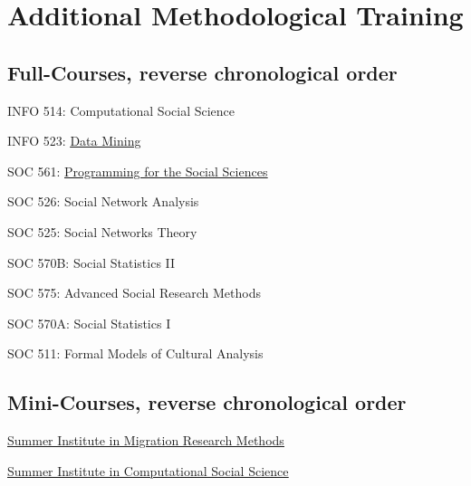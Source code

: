 
\section*{Additional Methodological Training}

\subsection*{Full-Courses, reverse chronological order}

INFO 514: Computational Social Science 

INFO 523: \href{https://kelseygonzalez.github.io/datamining/}
{\underline{Data Mining}} 

SOC 561: \href{https://jearl.faculty.arizona.edu/index.php/content/stata-resources-data-management}
{\underline{Programming for the Social Sciences}}

SOC 526: Social Network Analysis 

SOC 525: Social Networks Theory 

SOC 570B: Social Statistics II 

SOC 575: Advanced Social Research Methods 

SOC 570A: Social Statistics I 

SOC 511: Formal Models of Cultural Analysis 


\subsection*{Mini-Courses, reverse chronological order}

\href{https://bimi.berkeley.edu/summer-institute-migration-research-methods}
{\underline{Summer Institute in Migration Research Methods}} 

\href{https://compsocialscience.github.io/summer-institute/2020/duke/s}
{\underline{Summer Institute in Computational Social Science}} 

